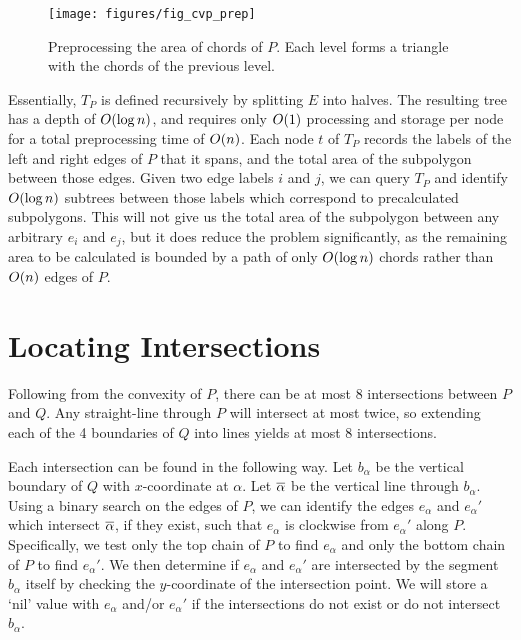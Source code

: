 \begin{figure}[t]
\begin{center}
  \texttt{[image: figures/fig\_cvp\_prep]}
  \caption[Preprocessing the area of chords of $P$.]{Preprocessing the area of chords of $P$.  Each level forms a triangle with the chords of the previous level.}
  \label{fig:convexp:preprocessing}
\end{center}
\end{figure}

Essentially, $T_P$ is defined recursively by splitting $E$ into halves. 
The resulting tree has a depth of $O\!\left(\log{n}\right)$, and requires only $O\!\left(1\right)$ processing and storage per node for a total preprocessing time of $O\!\left(n\right)$. 
Each node $t$ of $T_P$ records the labels of the left and right edges of $P$ that it spans, and the total area of the subpolygon between those edges.
Given two edge labels $i$ and $j$, we can query $T_P$ and identify $O\!\left(\log{n}\right)$ subtrees between those labels which correspond to precalculated subpolygons.
This will not give us the total area of the subpolygon between any arbitrary $e_i$ and $e_j$, but it does reduce the problem significantly, as the remaining area to be calculated is bounded by a path of only $O\!\left(\log{n}\right)$ chords rather than $O\!\left(n\right)$ edges of $P$.


\section{Locating Intersections}
\label{:convexp:intersections}

Following from the convexity of $P$, there can be at most $8$ intersections between $P$ and $Q$. 
Any straight-line through $P$ will intersect at most twice, so extending each of the 4 boundaries of $Q$ into lines yields at most 8 intersections.

Each intersection can be found in the following way. 
Let $b_\alpha$ be the vertical boundary of $Q$ with $x$-coordinate at $\alpha$. 
Let $\overline{\alpha}$ be the vertical line through $b_\alpha$. 
Using a binary search on the edges of $P$, we can identify the edges $e_\alpha$ and $e_\alpha'$ which intersect $\overline{\alpha}$, if they exist, such that $e_\alpha$ is clockwise from $e_\alpha'$ along $P$.
Specifically, we test only the top chain of $P$ to find $e_\alpha$ and only the bottom chain of $P$ to find $e_\alpha'$.
We then determine if $e_\alpha$ and $e_\alpha'$ are intersected by the segment $b_\alpha$ itself by checking the $y$-coordinate of the intersection point. 
We will store a `nil' value with $e_\alpha$ and/or $e_\alpha'$ if the intersections do not exist or do not intersect $b_\alpha$.

